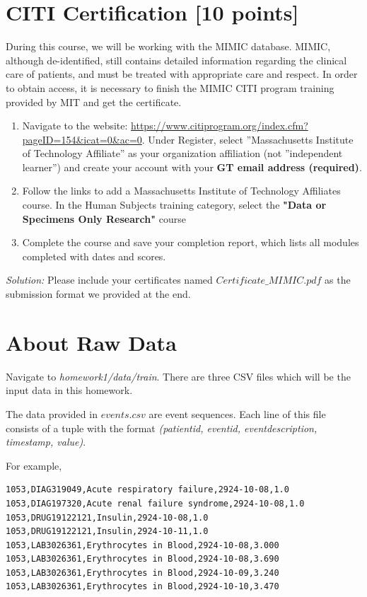 \documentclass[12pt]{article}
\begin{document}
\section{CITI Certification  [10 points] }
During this course, we will be working with the MIMIC database. MIMIC, although de-identified, still contains detailed information regarding the clinical care of patients, and must be treated with appropriate care and respect. In order to obtain access, it is necessary to finish the MIMIC CITI program training provided by MIT and get the certificate.

\begin{enumerate}
\item Navigate to the website: \url{https://www.citiprogram.org/index.cfm?pageID=154&icat=0&ac=0}. Under Register, select ''Massachusetts Institute of Technology Affiliate'' as your organization affiliation (not ''independent learner'') and create your account with your \textbf{GT email address (required)}.
\item Follow the links to add a Massachusetts Institute of Technology Affiliates course. In the Human Subjects training category, select the \textbf{"Data or Specimens Only Research"} course
\item Complete the course and save your completion report, which lists all modules completed with dates and scores.

\end{enumerate}
\textit{Solution:} Please include your certificates named \textit{$Certificate\_ MIMIC.pdf$} as the submission format we provided at the end.\\

\section*{About Raw Data}
Navigate to \textit{homework1/data/train}. There are three CSV files which will be the input data in this homework. 

The data provided in \textit{$events.csv$} are event sequences. Each line of this file consists of a tuple with the format \textit{(patient\textunderscore id, event\textunderscore id, event\textunderscore description, timestamp, value)}. 

For example, 

\begin{lstlisting}[frame=single, language=bash]
1053,DIAG319049,Acute respiratory failure,2924-10-08,1.0
1053,DIAG197320,Acute renal failure syndrome,2924-10-08,1.0
1053,DRUG19122121,Insulin,2924-10-08,1.0
1053,DRUG19122121,Insulin,2924-10-11,1.0
1053,LAB3026361,Erythrocytes in Blood,2924-10-08,3.000
1053,LAB3026361,Erythrocytes in Blood,2924-10-08,3.690
1053,LAB3026361,Erythrocytes in Blood,2924-10-09,3.240
1053,LAB3026361,Erythrocytes in Blood,2924-10-10,3.470
\end{lstlisting}
\end{document}
